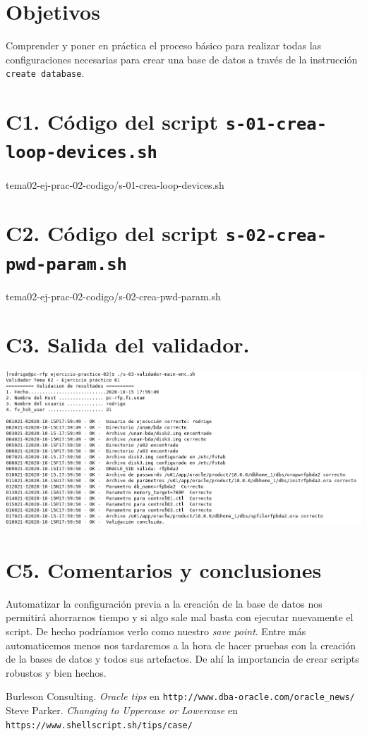 \documentclass{article}
\begin{document}
\section*{Objetivos}
Comprender y poner en práctica el proceso básico para realizar todas las 
configuraciones necesarias para crear una base de datos a través de la
instrucción \texttt{create database}.

\section*{C1. Código del script \texttt{s-01-crea-loop-devices.sh}}


{tema02-ej-prac-02-codigo/s-01-crea-loop-devices.sh}

\newpage
\section*{C2. Código del script \texttt{s-02-crea-pwd-param.sh}}


{tema02-ej-prac-02-codigo/s-02-crea-pwd-param.sh}

\section*{C3. Salida del validador.}

\includegraphics[width=\linewidth]{tema02-ej-prac-02-validador}

\section*{C5. Comentarios y conclusiones}

Automatizar la configuración previa a la creación de la base de datos nos 
permitirá ahorrarnos tiempo y si algo sale mal basta con ejecutar nuevamente
el script. De hecho podríamos verlo como nuestro \textit{save point}.
Entre más automaticemos menos nos tardaremos a la hora de hacer pruebas
con la creación de la bases de datos y todos sus artefactos. De ahí la 
importancia de crear scripts robustos y bien hechos.

\renewcommand\refname{Bibliografía y referencias}
\begin{thebibliography}{99}
     Burleson Consulting. \textit{Oracle tips } en 
    \texttt{http://www.dba-oracle.com/oracle\_news/}
     Steve Parker. \textit{Changing to Uppercase or 
    Lowercase} en \texttt{https://www.shellscript.sh/tips/case/} 
\end{thebibliography}
\end{document}
